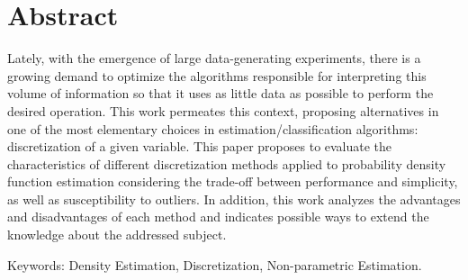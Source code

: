 %
%
\chapter*{Abstract}
\vspace{-1.5cm}

\noindent 

Lately, with the emergence of large data-generating experiments, there is a growing demand to optimize the algorithms responsible for interpreting this volume of information so that it uses as little data as possible to perform the desired operation. This work permeates this context, proposing alternatives in one of the most elementary choices in estimation/classification algorithms: discretization of a given variable. This paper proposes to evaluate the characteristics of different discretization methods applied to probability density function estimation considering the trade-off between performance and simplicity, as well as susceptibility to outliers. In addition, this work analyzes the advantages and disadvantages of each method and indicates possible ways to extend the knowledge about the addressed subject.
\vspace{0.5cm}

\noindent Keywords: Density Estimation, Discretization, Non-parametric Estimation. \\

\newpage
